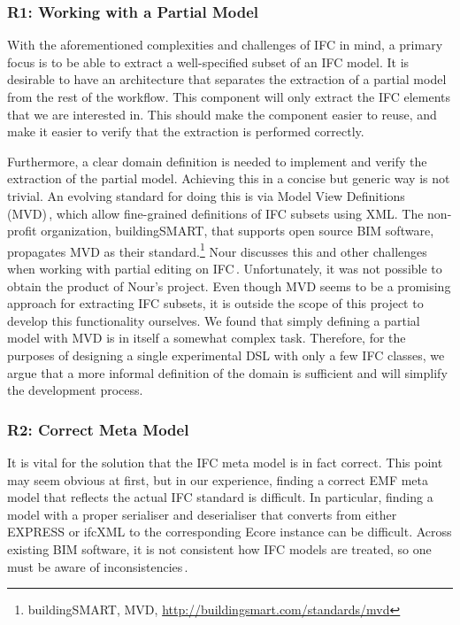 \subsubsection{R1: Working with a Partial Model}
With the aforementioned complexities and challenges of IFC in mind, a primary focus is to be able to extract a well-specified subset of an IFC model. It is desirable to have an architecture that separates the extraction of a partial model from the rest of the workflow. This component will only extract the IFC elements that we are interested in. This should make the component easier to reuse, and make it easier to verify that the extraction is performed correctly.

Furthermore, a clear domain definition is needed to implement and verify the extraction of the partial model. Achieving this in a concise but generic way is not trivial. An evolving standard for doing this is via Model View Definitions (MVD)\,\cite{nour08}, which allow fine-grained definitions of IFC subsets using XML. The non-profit organization, buildingSMART, that supports open source BIM software, propagates MVD as their standard.\footnote{buildingSMART, MVD, \url{http://buildingsmart.com/standards/mvd}} Nour discusses this and other challenges when working with partial editing on IFC\,\cite{nour08}. Unfortunately, it was not possible to obtain the product of Nour's project. Even though MVD seems to be a promising approach for extracting IFC subsets, it is outside the scope of this project to develop this functionality ourselves. We found that simply defining a partial model with MVD is in itself a somewhat complex task. Therefore, for the purposes of designing a single experimental DSL with only a few IFC classes, we argue that a more informal definition of the domain is sufficient and will simplify the development process.

\subsubsection{R2: Correct Meta Model}
It is vital for the solution that the IFC meta model is in fact correct. This point may seem obvious at first, but in our experience, finding a correct EMF meta model that reflects the actual IFC standard is difficult. In particular, finding a model with a proper serialiser and deserialiser that converts from either EXPRESS or ifcXML to the corresponding Ecore instance can be difficult. Across existing BIM software, it is not consistent how IFC models are treated, so one must be aware of inconsistencies\,\cite[p. 4]{quteprints37725}.


